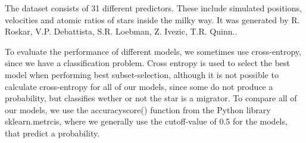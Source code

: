 The dataset consists of 31 different predictors. These include simulated positions, velocities and atomic ratios of stars inside the milky way. It was generated by R. Roskar, V.P. Debattista,  S.R. Loebman, Z. Ivezic, T.R. Quinn.\cite{Roskar:2011ie}.

To evaluate the performance of different models, we sometimes use cross-entropy, since we have a classification problem. Cross entropy is used to select the best model when performing best subset-selection, although it is not possible to calculate cross-entropy for all of our models, since some do not produce a probability, but classifies wether or not the star is a migrator. To compare all of our models, we use the accuracy\textunderscore score() function from the Python library sklearn.metrcis, where we generally use the cutoff-value of 0.5 for the models, that predict a probability.